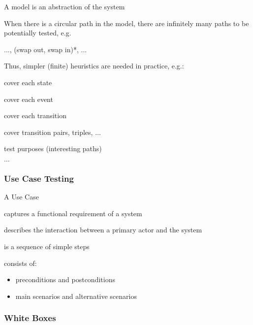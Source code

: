 \begin{itemize*}
	\item A model is an abstraction of the system
	\item When there is a circular path in the model, there are infinitely many paths to be potentially tested, e.g.
	\begin{itemize*}
		\item ..., (swap out, swap in)*, ...
	\end{itemize*}
	\item Thus, simpler (finite) heuristics are needed in practice,	e.g.:
	\begin{itemize*}
		\item cover each state
		\item cover each event
		\item cover each transition
		\item cover transition pairs, triples, $\dots$
		\item test purposes (interesting paths)
		\item $\dots$
	\end{itemize*}	
\end{itemize*}


\subsubsection{Use Case Testing}

\begin{itemize*}
	\item A Use Case
	\begin{itemize*}
		\item captures a functional requirement of a system
		\item describes the interaction between a primary actor and
		the system
		\item is a sequence of simple steps
		\item consists of:
		\begin{itemize}
			\item preconditions and postconditions
			\item main scenarios and alternative scenarios
		\end{itemize}		
	\end{itemize*}
\end{itemize*}

\subsubsection{White Boxes}


